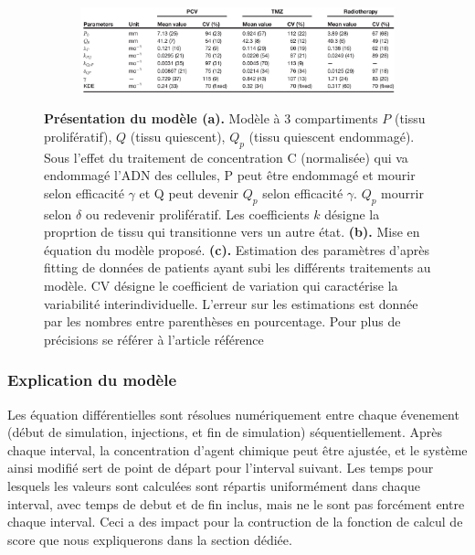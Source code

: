 \documentclass[12pt]{article}
\begin{document}
\begin{figure}
    \vspace{1cm}
    \begin{subfigure}[t]{\textwidth}
    \centering
        \includegraphics[width=\linewidth]{Image/tableau.JPG} 
        \caption{} \label{fig:tableau}
    \end{subfigure}
    
    \caption{\textbf{Présentation du modèle \cite{} (a).} Modèle à 3 compartiments $P$ (tissu prolifératif), $Q$ (tissu quiescent), $Q_{p}$ (tissu quiescent endommagé). Sous l'effet du traitement de concentration C (normalisée) qui va endommagé l'ADN des cellules, P peut être endommagé et mourir selon efficacité $\gamma$ et Q peut devenir $Q_p$ selon efficacité $\gamma$. $Q_{p}$ mourrir selon $\delta$ ou redevenir prolifératif. Les coefficients $k$ désigne la proprtion de tissu qui transitionne vers un autre état.  \textbf{(b).} Mise en équation du modèle proposé. \textbf{(c).} Estimation des paramètres d'après fitting de données de patients ayant subi les différents traitements au modèle. CV désigne le coefficient de variation qui caractérise la variabilité interindividuelle. L'erreur sur les estimations est donnée par les nombres entre parenthèses en pourcentage. Pour plus de précisions se référer à l'article référence\cite{}}
\end{figure}

\subsubsection{Explication du modèle}
Les équation différentielles sont résolues numériquement entre chaque évenement (début de simulation, injections, et fin de simulation) séquentiellement. Après chaque interval, la concentration d'agent chimique peut être ajustée, et le système ainsi modifié sert de point de départ pour l'interval suivant. Les temps pour lesquels les valeurs sont calculées sont répartis uniformément dans chaque interval, avec temps de debut et de fin inclus, mais ne le sont pas forcément entre chaque interval. Ceci a des impact pour la contruction de la fonction de calcul de score que nous expliquerons dans la section dédiée.
\end{document}
